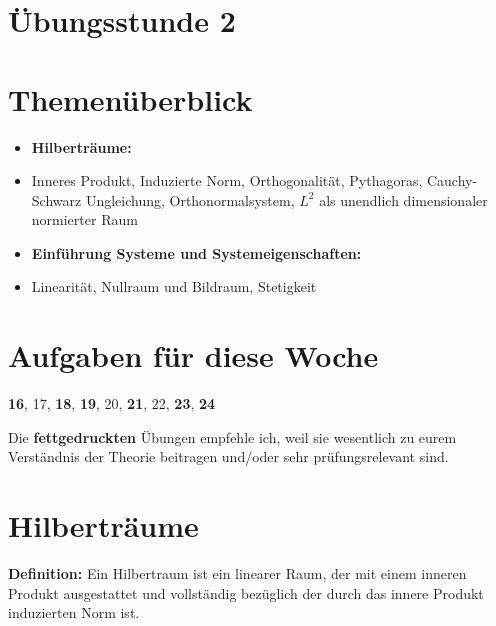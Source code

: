 \documentclass[11pt]{article}
\begin{document}
\thispagestyle{firstpage}

\setlength{\headheight}{1 \baselineskip}  %
\setlength{\parindent}{0pt}  %
\setlength{\parskip}{\baselineskip}  %

\vspace*{-5px}
\section*{Übungsstunde 2}

\section*{Themenüberblick}
\begin{itemize}
    \item \textbf{Hilberträume:}
    \item[] Inneres Produkt, Induzierte Norm, Orthogonalität, Pythagoras, Cauchy-Schwarz Ungleichung, Orthonormalsystem, $L^2$ als unendlich dimensionaler normierter Raum
    \item \textbf{Einführung Systeme und Systemeigenschaften:}
    \item[] Linearität, Nullraum und Bildraum, Stetigkeit
\end{itemize}

\section*{Aufgaben für diese Woche}
\vspace{-0.5cm}

\textbf{16}, 17, \textbf{18}, \textbf{19}, 20, \textbf{21}, 22, \textbf{23}, \textbf{24}\\
\vspace{-0.5cm}

Die \textbf{fettgedruckten} Übungen empfehle ich, weil sie wesentlich zu eurem Verständnis der Theorie beitragen und/oder sehr prüfungsrelevant sind.

\vfill \null
\pagebreak

\section*{Hilberträume}

\vspace*{-0.5cm}
\textbf{Definition:} Ein Hilbertraum ist ein linearer Raum, der mit einem inneren Produkt ausgestattet und vollständig bezüglich der durch das innere Produkt induzierten Norm ist.
\end{document}
